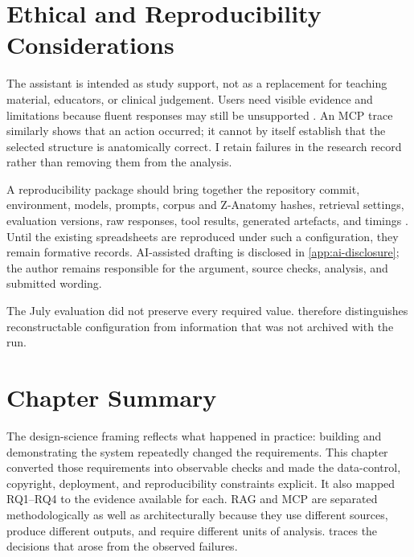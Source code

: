 \section{Ethical and Reproducibility Considerations}
\label{sec:ethics-reproducibility}

The assistant is intended as study support, not as a replacement for teaching material, educators, or clinical judgement. Users need visible evidence and limitations because fluent responses may still be unsupported \parencite{ji2023,kasneci2023}. An MCP trace similarly shows that an action occurred; it cannot by itself establish that the selected structure is anatomically correct. I retain failures in the research record rather than removing them from the analysis.

A reproducibility package should bring together the repository commit, environment, models, prompts, corpus and Z-Anatomy hashes, retrieval settings, evaluation versions, raw responses, tool results, generated artefacts, and timings \parencite{pineau2021}. Until the existing spreadsheets are reproduced under such a configuration, they remain formative records. AI-assisted drafting is disclosed in \cref{app:ai-disclosure}; the author remains responsible for the argument, source checks, analysis, and submitted wording.

The July evaluation did not preserve every required value.  therefore distinguishes reconstructable configuration from information that was not archived with the run.

\section{Chapter Summary}
\label{sec:methodology-summary}

The design-science framing reflects what happened in practice: building and demonstrating the system repeatedly changed the requirements. This chapter converted those requirements into observable checks and made the data-control, copyright, deployment, and reproducibility constraints explicit. It also mapped RQ1--RQ4 to the evidence available for each. RAG and MCP are separated methodologically as well as architecturally because they use different sources, produce different outputs, and require different units of analysis.  traces the decisions that arose from the observed failures.
